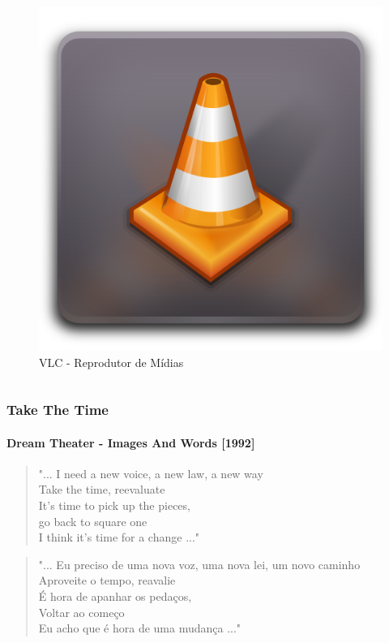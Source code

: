 \begin{frame}
\begin{columns}
	\begin{column}{4cm}
		\begin{figure}
			\includegraphics[scale=0.2]{img/vlc.png} 
			\caption{VLC - Reprodutor de Mídias}
		\end{figure}
	\end{column}
	
\end{columns}

\end{frame}

\begin{frame}\frametitle{Take The Time}\framesubtitle{Dream Theater - Images And Words [1992]}

\begin{quote}
"... I need a new {\Large voice}, a new {\Large law}, a {\LARGE new way}\\
Take the time, reevaluate\\
It's time to {\LARGE pick up the pieces},\\
go back to {\large square one}\\
I think it's {\huge time for a change} ..."
\end{quote}

\begin{quote}
"... Eu preciso de uma nova voz, uma nova lei, um novo caminho\\
Aproveite o tempo, reavalie\\
É hora de apanhar os pedaços,\\
Voltar ao começo\\
Eu acho que é hora de uma mudança ..."
\end{quote}

\end{frame}


